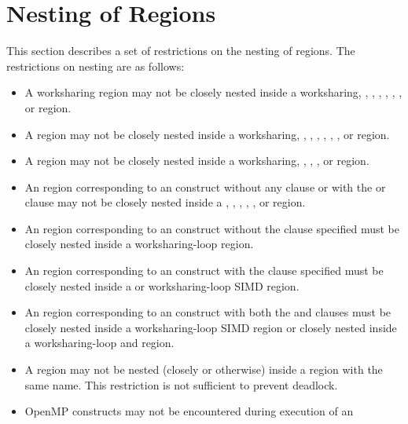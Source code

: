 \section{Nesting of Regions}
\label{sec:Nesting of Regions}
This section describes a set of restrictions on the nesting of regions. The 
restrictions on nesting are as follows:

\begin{itemize}
\item A worksharing region may not be closely nested inside a worksharing,
      , , , , ,
      , or  region.
\item A  region may not be closely nested inside a worksharing,
      , , , , ,
      , or  region.
\item A  region may not be closely nested inside a worksharing,
      , , , or  region.
\item An  region corresponding to an  construct
      without any clause or with the  or  clause 
      may not be closely nested inside a , , 
      , , , or  region.
\item An  region corresponding to an  construct 
      without the  clause specified must be closely nested inside 
      a worksharing-loop region.
\item An  region corresponding to an  construct 
      with the  clause specified must be closely nested inside a 
       or worksharing-loop SIMD region.
\item An  region corresponding to an  construct 
      with both the  and  clauses must be closely 
      nested inside a worksharing-loop SIMD region or closely nested inside 
      a worksharing-loop and  region.
\item A  region may not be nested (closely or otherwise) inside 
      a  region with the same name. This restriction is not 
      sufficient to prevent deadlock.
\item OpenMP constructs may not be encountered during execution of an

\end{itemize}
